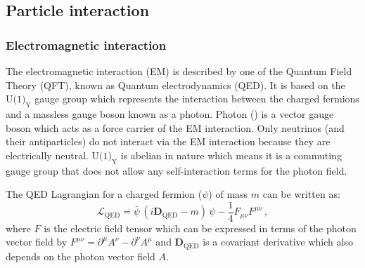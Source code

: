 \subsection{Particle interaction}%
\label{sec:theory:standardmodel:interaction}

\subsubsection{Electromagnetic interaction}%
\label{sec:theory:standardmodel:em}
The electromagnetic interaction (EM) is described by one of the Quantum Field Theory (QFT), known as Quantum electrodynamics (QED). It is based on the $\text{U(1)}_{\text{Y}}$ gauge group which represents the interaction between the charged fermions and a massless gauge boson known as a photon. Photon (\Pphoton) is a vector gauge boson which acts as a force carrier of the EM interaction. Only neutrinos (and their antiparticles) do not interact via the EM interaction because they are electrically neutral. $\text{U(1)}_{\text{Y}}$ is abelian in nature which means it is a commuting gauge group that does not allow any self-interaction terms for the photon field.

The QED Lagrangian for a charged fermion ($\psi$) of mass $m$ can be written as:
\begin{equation}
\mathcal{L}_{\text{QED}} = \bar{\psi} \, (i\textbf{D}_{\text{QED}} - m) \, \psi - \frac{1}{4}F_{\mu\nu}F^{\mu\nu} \,,
\end{equation}
where $F$ is the electric field tensor which can be expressed in terms of the photon vector field by $F^{\mu\nu} = \partial^{\mu}A^{\nu} - \partial^{\nu}A^{\mu}$ and $\textbf{D}_{\text{QED}}$ is a covariant derivative which also depends on the photon vector field $A$.~\cite{halzen}

